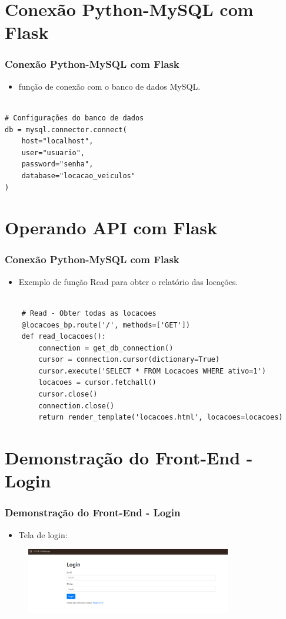\documentclass[aspectratio=169,xcolor=dvipsnames]{beamer}
\begin{document}
\section{Conexão Python-MySQL com Flask}
\begin{frame}[fragile]
\frametitle{Conexão Python-MySQL com Flask}
\begin{itemize}
    \item função de conexão com o banco de dados MySQL.
\end{itemize}
\begin{lstlisting}

# Configurações do banco de dados
db = mysql.connector.connect(
    host="localhost",
    user="usuario",
    password="senha",
    database="locacao_veiculos"
)

\end{lstlisting}
\end{frame}

\section{Operando API com Flask}
\begin{frame}[fragile]
\frametitle{Conexão Python-MySQL com Flask}
\begin{itemize}
    \item Exemplo de função Read para obter o relatório das locações.
\end{itemize}
\begin{lstlisting}

    # Read - Obter todas as locacoes
    @locacoes_bp.route('/', methods=['GET'])
    def read_locacoes():
        connection = get_db_connection()
        cursor = connection.cursor(dictionary=True)
        cursor.execute('SELECT * FROM Locacoes WHERE ativo=1')
        locacoes = cursor.fetchall()
        cursor.close()
        connection.close()
        return render_template('locacoes.html', locacoes=locacoes)
\end{lstlisting}
\end{frame}


\section{Demonstração do Front-End - Login}
\begin{frame}
\frametitle{Demonstração do Front-End - Login}
\begin{itemize}
 \item Tela de login:
\end{itemize}
\begin{figure}
    \includegraphics[width=0.80\textwidth]{images/Login.png} 
\end{figure}
\end{frame}
\end{document}
